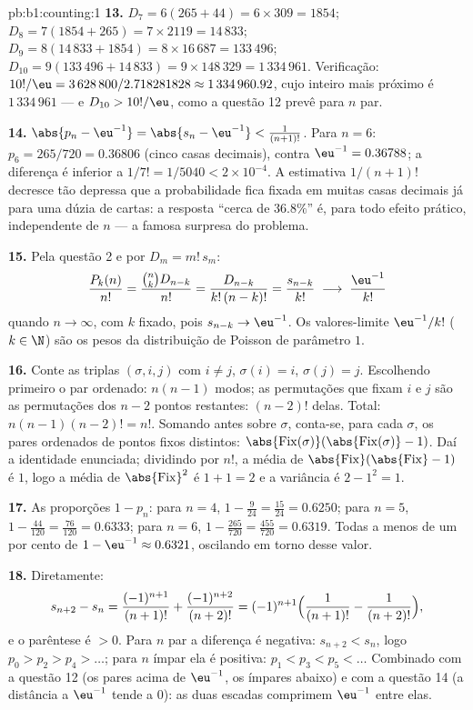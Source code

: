 \begin{solution}{pb:b1:counting:1}
\textbf{13.} $D_7 = 6(265 + 44) = 6 \times 309 = 1854$; $D_8 =
7(1854 + 265) = 7 \times 2119 = 14\,833$; $D_9 = 8(14\,833 + 1854)
= 8 \times 16\,687 = 133\,496$; $D_{10} = 9(133\,496 + 14\,833) =
9 \times 148\,329 = 1\,334\,961$. Verificação: $10!/\eu = 3\,628\,800 /
2.718281828 \approx 1\,334\,960.92$, cujo inteiro mais próximo é
$1\,334\,961$ --- e $D_{10} > 10!/\eu$, como a questão 12 prevê
para $n$ par.

\textbf{14.} $\abs{p_n - \eu^{-1}} = \abs{s_n - \eu^{-1}} <
\frac1{(n+1)!}$. Para $n = 6$: $p_6 = 265/720 = 0.36806$ (cinco
casas decimais), contra $\eu^{-1} = 0.36788$; a diferença é inferior a $1/7! =
1/5040 < 2 \times 10^{-4}$. A estimativa $1/(n+1)!$ decresce tão depressa
que a probabilidade fica fixada em muitas casas decimais já para uma
dúzia de cartas: a resposta ``cerca de $36.8\%$'' é, para todo
efeito prático, independente de $n$ --- a famosa surpresa do
problema.

\textbf{15.} Pela questão 2 e por $D_m = m!\,s_m$:
\[
\frac{P_k(n)}{n!} = \frac{\binom nk D_{n-k}}{n!}
= \frac{D_{n-k}}{k!\,(n-k)!} = \frac{s_{n-k}}{k!}
\;\longrightarrow\; \frac{\eu^{-1}}{k!}
\]
quando $n \to \infty$, com $k$ fixado, pois $s_{n-k} \to \eu^{-1}$.
Os valores-limite $\eu^{-1}/k!$ ($k \in \N$) são os pesos da
distribuição de Poisson de parâmetro $1$.

\textbf{16.} Conte as triplas $(\sigma, i, j)$ com $i \neq j$,
$\sigma(i) = i$, $\sigma(j) = j$. Escolhendo primeiro o par ordenado:
$n(n-1)$ modos; as permutações que fixam $i$ e $j$ são as
permutações dos $n - 2$ pontos restantes: $(n-2)!$ delas.
Total: $n(n-1)(n-2)! = n!$. Somando antes sobre $\sigma$, conta-se,
para cada $\sigma$, os pares ordenados de pontos fixos distintos:
$\abs{\mathrm{Fix}(\sigma)}(\abs{\mathrm{Fix}(\sigma)}-1)$.
Daí a identidade enunciada; dividindo por $n!$, a média de
$\abs{\mathrm{Fix}}(\abs{\mathrm{Fix}} - 1)$ é $1$, logo a média
de $\abs{\mathrm{Fix}}^2$ é $1 + 1 = 2$ e a variância é $2 -
1^2 = 1$.

\textbf{17.} As proporções $1 - p_n$: para $n = 4$, $1 - \frac
9{24} = \frac{15}{24} = 0.6250$; para $n = 5$, $1 - \frac{44}{120} =
\frac{76}{120} = 0.6333$; para $n = 6$, $1 - \frac{265}{720} =
\frac{455}{720} = 0.6319$. Todas a menos de um por cento de $1 - \eu^{-1}
\approx 0.6321$, oscilando em torno desse valor.

\textbf{18.} Diretamente:
\[
s_{n+2} - s_n = \frac{(-1)^{n+1}}{(n+1)!} +
\frac{(-1)^{n+2}}{(n+2)!}
= (-1)^{n+1}\Bigl(\frac1{(n+1)!} - \frac1{(n+2)!}\Bigr),
\]
e o parêntese é $> 0$. Para $n$ par a diferença é
negativa: $s_{n+2} < s_n$, logo $p_0 > p_2 > p_4 > \dots$; para $n$
ímpar ela é positiva: $p_1 < p_3 < p_5 < \dots$ Combinado com a
questão 12 (os pares acima de $\eu^{-1}$, os ímpares abaixo) e com a
questão 14 (a distância a $\eu^{-1}$ tende a $0$): as duas escadas
comprimem $\eu^{-1}$ entre elas.


\end{solution}
